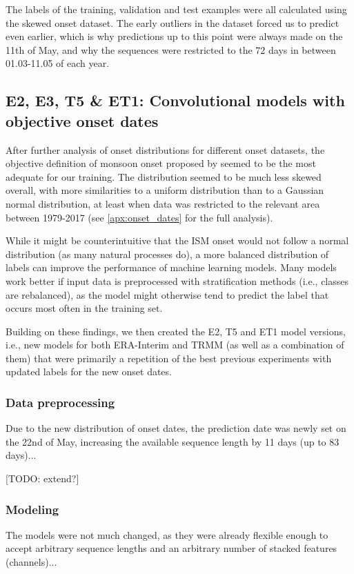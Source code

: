 The labels of the training, validation and test examples were all calculated using the skewed onset dataset. The early outliers in the dataset forced us to predict even earlier, which is why predictions up to this point were always made on the 11th of May, and why the sequences were restricted to the 72 days in between 01.03-11.05 of each year.


\clearpage
\subsection{E2, E3, T5 \& ET1: Convolutional models with objective onset dates}
\label{sst:nn_e2t5}
After further analysis of onset distributions for different onset datasets, the objective definition of monsoon onset proposed by \citet{Singh.2009} seemed to be the most adequate for our training. The distribution seemed to be much less skewed overall, with more similarities to a uniform distribution than to a Gaussian normal distribution, at least when data was restricted to the relevant area between 1979-2017 (see \cref{apx:onset_dates} for the full analysis).

While it might be counterintuitive that the ISM onset would not follow a normal distribution (as many natural processes do), a more balanced distribution of labels can improve the performance of machine learning models. Many models work better if input data is preprocessed with stratification methods (i.e., classes are rebalanced), as the model might otherwise tend to predict the label that occurs most often in the training set.

Building on these findings, we then created the E2, T5 and ET1 model versions, i.e., new models for both ERA-Interim and TRMM (as well as a combination of them) that were primarily a repetition of the best previous experiments with updated labels for the new onset dates.

\subsubsection{Data preprocessing}
\label{ssst:nn_e2t5_data}
Due to the new distribution of onset dates, the prediction date was newly set on the 22nd of May, increasing the available sequence length by 11 days (up to 83 days)...

[TODO: extend?]

\subsubsection{Modeling}
\label{ssst:nn_e2t5_modeling}
The models were not much changed, as they were already flexible enough to accept arbitrary sequence lengths and an arbitrary number of stacked features (channels)...

